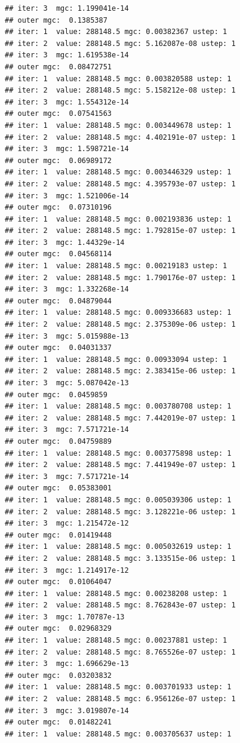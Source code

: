 \documentclass{article}\usepackage[]{graphicx}\usepackage[]{xcolor}
\makeatletter
\newenvironment{kframe}{%
 \def\at@end@of@kframe{}%
 \ifinner\ifhmode%
  \def\at@end@of@kframe{\end{minipage}}%
  \begin{minipage}{\columnwidth}%
 \fi\fi%
 \def\FrameCommand##1{\hskip\@totalleftmargin \hskip-\fboxsep
 \colorbox{shadecolor}{##1}\hskip-\fboxsep
     \hskip-\linewidth \hskip-\@totalleftmargin \hskip\columnwidth}%
 \MakeFramed {\advance\hsize-\width
   \@totalleftmargin\z@ \linewidth\hsize
   \@setminipage}}%
 {\par\unskip\endMakeFramed%
 \at@end@of@kframe}
\newenvironment{knitrout}{}{} %
\makeatother
\begin{document}
\begin{knitrout}
\begin{kframe}
\begin{verbatim}
## iter: 3  mgc: 1.199041e-14 
## outer mgc:  0.1385387 
## iter: 1  value: 288148.5 mgc: 0.00382367 ustep: 1 
## iter: 2  value: 288148.5 mgc: 5.162087e-08 ustep: 1 
## iter: 3  mgc: 1.619538e-14 
## outer mgc:  0.08472751 
## iter: 1  value: 288148.5 mgc: 0.003820588 ustep: 1 
## iter: 2  value: 288148.5 mgc: 5.158212e-08 ustep: 1 
## iter: 3  mgc: 1.554312e-14 
## outer mgc:  0.07541563 
## iter: 1  value: 288148.5 mgc: 0.003449678 ustep: 1 
## iter: 2  value: 288148.5 mgc: 4.402191e-07 ustep: 1 
## iter: 3  mgc: 1.598721e-14 
## outer mgc:  0.06989172 
## iter: 1  value: 288148.5 mgc: 0.003446329 ustep: 1 
## iter: 2  value: 288148.5 mgc: 4.395793e-07 ustep: 1 
## iter: 3  mgc: 1.521006e-14 
## outer mgc:  0.07310196 
## iter: 1  value: 288148.5 mgc: 0.002193836 ustep: 1 
## iter: 2  value: 288148.5 mgc: 1.792815e-07 ustep: 1 
## iter: 3  mgc: 1.44329e-14 
## outer mgc:  0.04568114 
## iter: 1  value: 288148.5 mgc: 0.00219183 ustep: 1 
## iter: 2  value: 288148.5 mgc: 1.790176e-07 ustep: 1 
## iter: 3  mgc: 1.332268e-14 
## outer mgc:  0.04879044 
## iter: 1  value: 288148.5 mgc: 0.009336683 ustep: 1 
## iter: 2  value: 288148.5 mgc: 2.375309e-06 ustep: 1 
## iter: 3  mgc: 5.015988e-13 
## outer mgc:  0.04031337 
## iter: 1  value: 288148.5 mgc: 0.00933094 ustep: 1 
## iter: 2  value: 288148.5 mgc: 2.383415e-06 ustep: 1 
## iter: 3  mgc: 5.087042e-13 
## outer mgc:  0.0459859 
## iter: 1  value: 288148.5 mgc: 0.003780708 ustep: 1 
## iter: 2  value: 288148.5 mgc: 7.442019e-07 ustep: 1 
## iter: 3  mgc: 7.571721e-14 
## outer mgc:  0.04759889 
## iter: 1  value: 288148.5 mgc: 0.003775898 ustep: 1 
## iter: 2  value: 288148.5 mgc: 7.441949e-07 ustep: 1 
## iter: 3  mgc: 7.571721e-14 
## outer mgc:  0.05383001 
## iter: 1  value: 288148.5 mgc: 0.005039306 ustep: 1 
## iter: 2  value: 288148.5 mgc: 3.128221e-06 ustep: 1 
## iter: 3  mgc: 1.215472e-12 
## outer mgc:  0.01419448 
## iter: 1  value: 288148.5 mgc: 0.005032619 ustep: 1 
## iter: 2  value: 288148.5 mgc: 3.133515e-06 ustep: 1 
## iter: 3  mgc: 1.214917e-12 
## outer mgc:  0.01064047 
## iter: 1  value: 288148.5 mgc: 0.00238208 ustep: 1 
## iter: 2  value: 288148.5 mgc: 8.762843e-07 ustep: 1 
## iter: 3  mgc: 1.70787e-13 
## outer mgc:  0.02968329 
## iter: 1  value: 288148.5 mgc: 0.00237881 ustep: 1 
## iter: 2  value: 288148.5 mgc: 8.765526e-07 ustep: 1 
## iter: 3  mgc: 1.696629e-13 
## outer mgc:  0.03203832 
## iter: 1  value: 288148.5 mgc: 0.003701933 ustep: 1 
## iter: 2  value: 288148.5 mgc: 6.956126e-07 ustep: 1 
## iter: 3  mgc: 3.019807e-14 
## outer mgc:  0.01482241 
## iter: 1  value: 288148.5 mgc: 0.003705637 ustep: 1 

\end{verbatim}
\end{kframe}
\end{knitrout}
\end{document}
